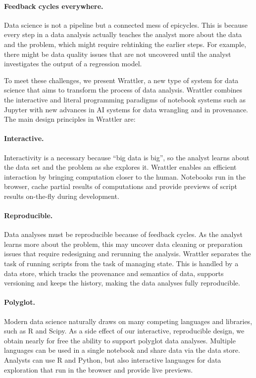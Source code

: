 \documentclass[sigplan,preprint,10pt]{acmart}\settopmatter{printfolios=true,printccs=false,printacmref=false}
\theoremstyle{plain}
\theoremstyle{definition}
\begin{document}
\paragraph{Feedback cycles everywhere.} Data science is
not a pipeline but a connected mess of epicycles. This is because every step
in a data analysis actually teaches
the analyst more about the data and the problem, which might require rehtinking the earlier steps.
For example, there might be data quality issues that
are not uncovered until the analyst
investigates the output of a regression model.

\vspace{1em}
To meet these challenges, we present Wrattler,
a new type of system for data science
that aims to transform the process
of data analysis.
Wrattler combines the interactive and literal programming paradigms
of notebook systems such as Jupyter
with new advances in AI systems for data wrangling and in provenance.
The main design principles in Wrattler are:

\paragraph{Interactive.} Interactivity
is a necessary because ``big data is big'', so the analyst learns about
the data set and the problem as she explores it.
Wrattler enables an efficient interaction by bringing computation closer to the human.
Notebooks run in the browser, cache partial results of computations and provide previews
of script results on-the-fly during development.

\paragraph{Reproducible.}
Data analyses must be reproducible
because of feedback cycles. As the
analyst learns more about the problem,
this may uncover data cleaning or preparation issues that require
redesigning and rerunning the analysis.
Wrattler separates the task of running scripts from the task of managing state.
This is handled by a data store, which tracks the provenance and semantics of data, supports
versioning and keeps the history, making the data analyses fully reproducible.

\paragraph{Polyglot.}
Modern data science naturally draws
on many competing languages and libraries, such as R and Scipy. As a side effect
of our interactive, reproducible design,
we obtain nearly for free the ability
to support polyglot data analyses.
Multiple languages can be used in a single notebook and share data via the data store.
Analysts can use R and Python, but also interactive languages for data exploration
that run in the browser and provide live previews.
\end{document}
